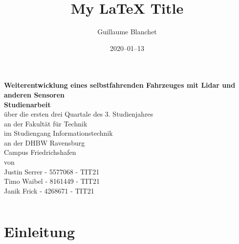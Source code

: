 \documentclass[12pt]{article}
\title{My LaTeX Title}
\author{Guillaume Blanchet}
\date{2020–01–13}
\begin{document}

\begin{titlepage}
	\begin{minipage}{6in}
	\vspace*{-2cm}
    \centering
    \raisebox{-0.5\height}{}
    \hfill
    \end{minipage}
	\begin{center}
		\vspace*{0.5cm}
		\LARGE\textbf{Weiterentwicklung eines selbstfahrenden Fahrzeuges mit Lidar
        und anderen Sensoren}\\
		\vspace*{2cm}
		\textbf{Studienarbeit}\\
		\normalsize
		{\"u}ber die ersten drei Quartale des 3. Studienjahres\\
		\vspace*{1.3cm}
		an der Fakult{\"a}t f{\"u}r Technik\\
		im Studiengang Informationstechnik\\
		\vspace*{1cm}
		an der DHBW Ravensburg\\
		Campus Friedrichshafen\\
		\vspace*{1cm}
		von\\
		Justin Serrer - 5577068 - TIT21 \\ 
		Timo Waibel - 8161449 - TIT21 \\
		Janik Frick - 4268671 - TIT21 \\
		\vspace*{2cm}
		\vfill
	\end{center}
	\begin{tabular}{ll}
	\end{tabular}
\end{titlepage}
\newpage
\tableofcontents
\newpage
\listoffigures
\newpage

\section{Einleitung}
\end{document}
